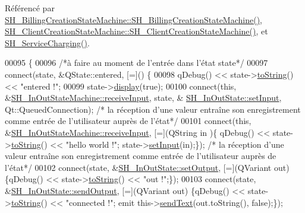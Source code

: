 Référencé par \hyperlink{classSH__BillingCreationStateMachine_ad62b77fa4aeafe200056ff3974562f83}{S\-H\-\_\-\-Billing\-Creation\-State\-Machine\-::\-S\-H\-\_\-\-Billing\-Creation\-State\-Machine()}, \hyperlink{classSH__ClientCreationStateMachine_a0b406b0f404c0fd33bf35be8ce0cc811}{S\-H\-\_\-\-Client\-Creation\-State\-Machine\-::\-S\-H\-\_\-\-Client\-Creation\-State\-Machine()}, et \hyperlink{classSH__ServiceCharging_afa5273d046049b1c2b020a6a19a8290b}{S\-H\-\_\-\-Service\-Charging()}.


\begin{DoxyCode}
00095 \{
00096     \textcolor{comment}{/*à faire au moment de l'entrée dans l'état state*/}
00097     connect(state, &QState::entered, [=]() \{
00098         qDebug() << state->\hyperlink{classSH__GenericState_a7779babbb40f3f8faa71112204d9804f}{toString}() << \textcolor{stringliteral}{"entered !"};
00099         state->\hyperlink{classSH__InOutState_a616f88b20478b81b2927a9ddc2b4f521}{display}(\textcolor{keyword}{true});
00100         connect(\textcolor{keyword}{this}, &\hyperlink{classSH__InOutStateMachine_a037ed5e13ecfae2123a8d4940292e410}{SH\_InOutStateMachine::receiveInput}, state, &
      \hyperlink{classSH__InOutState_aaec9c2b5ef7c406bff7469461352d47c}{SH\_InOutState::setInput}, Qt::QueuedConnection); \textcolor{comment}{/* la réception d'une valeur
       entraîne son enregistrement comme entrée de l'utilisateur auprès de l'état*/}
00101         connect(\textcolor{keyword}{this}, &\hyperlink{classSH__InOutStateMachine_a037ed5e13ecfae2123a8d4940292e410}{SH\_InOutStateMachine::receiveInput}, [=](QString in
      )\{ qDebug() << state->\hyperlink{classSH__GenericState_a7779babbb40f3f8faa71112204d9804f}{toString}() << \textcolor{stringliteral}{"hello world !"}; state->\hyperlink{classSH__InOutState_aaec9c2b5ef7c406bff7469461352d47c}{setInput}(in);\}); \textcolor{comment}{/* la réception
       d'une valeur entraîne son enregistrement comme entrée de l'utilisateur auprès de l'état*/}
00102         connect(state, &\hyperlink{classSH__InOutState_af611c84134e262739cd834797b315c80}{SH\_InOutState::setOutput}, [=](QVariant out) \{qDebug() << 
      state->\hyperlink{classSH__GenericState_a7779babbb40f3f8faa71112204d9804f}{toString}() << \textcolor{stringliteral}{"out !"};\});
00103         connect(state, &\hyperlink{classSH__InOutState_a77921c5f42059bc97361f4ff7827da12}{SH\_InOutState::sendOutput}, [=](QVariant out) \{qDebug() << 
      state->\hyperlink{classSH__GenericState_a7779babbb40f3f8faa71112204d9804f}{toString}() << \textcolor{stringliteral}{"connected !"}; emit this->\hyperlink{classSH__InOutStateMachine_a5e7f5958bae31696b6a8deab94ad2b4f}{sendText}(out.toString(), \textcolor{keyword}{false});\});

\end{DoxyCode}
